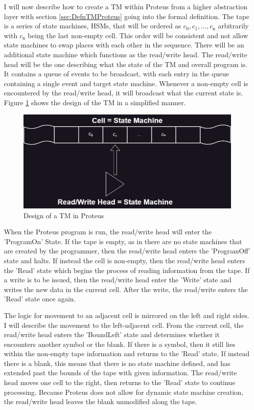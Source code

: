 I will now describe how to create a TM within Proteus from a higher abstraction layer with section \ref{sec:DefnTMProteus} going into the formal definition.
The tape is a series of state machines, HSMs, that will be ordered as $c_{0}, c_{1}, \dots , c_{\text{n}}$ arbitrarily with $c_{\text{n}}$ being the last non-empty cell.
This order will be consistent and not allow state machines to swap places with each other in the sequence.
There will be an additional state machine which functions as the read/write head.
The read/write head will be the one describing what the state of the TM and overall program is.
It contains a queue of events to be broadcast, with each entry in the queue containing a single event and target state machine.
Whenever a non-empty cell is encountered by the read/write head, it will broadcast what the current state is.
Figure \ref{fig:ProteusTMDesign} shows the design of the TM in a simplified manner.

\begin{figure}[h!]
    \centering
    \includegraphics[width=16cm]{images/ProteusTMDesign.png}
       \caption{Design of a TM in Proteus}
           \label{fig:ProteusTMDesign}
\end{figure}

When the Proteus program is run, the read/write head will enter the 'ProgramOn' State.
If the tape is empty, as in there are no state machines that are created by the programmer, then the read/write head enters the 'ProgramOff' state and halts.
If instead the cell is non-empty, then the read/write head enters the 'Read' state which begins the process of reading information from the tape.
If a write is to be issued, then the read/write head enter the 'Write' state and writes the new data in the current cell.
After the write, the read/write enters the 'Read' state once again.

The logic for movement to an adjacent cell is mirrored on the left and right sides.
I will describe the movement to the left-adjacent cell.
From the current cell, the read/write head enters the 'BoundLeft' state and determines whether it encounters another symbol or the blank.
If there is a symbol, then it still lies within the non-empty tape information and returns to the 'Read' state.
If instead there is a blank, this means that there is no state machine defined, and has extended past the bounds of the tape with given information.
The read/write head moves one cell to the right, then returns to the 'Read' state to continue processing.
Because Proteus does not allow for dynamic state machine creation, the read/write head leaves the blank unmodified along the tape.

